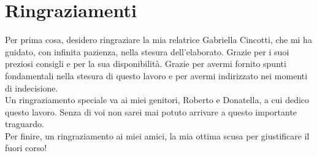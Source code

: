 \documentclass[../main.tex]{subfiles}
\begin{document}
\chapter*{Ringraziamenti}

Per prima cosa, desidero ringraziare la mia relatrice Gabriella Cincotti, che mi ha guidato, con infinita pazienza, nella stesura dell’elaborato. Grazie per i suoi preziosi consigli e per la sua disponibilità. Grazie per avermi fornito spunti fondamentali nella stesura di questo lavoro e per avermi indirizzato nei momenti di indecisione.\\

\noindent Un ringraziamento speciale va ai miei genitori, Roberto e Donatella, a cui dedico questo lavoro. Senza di voi non sarei mai potuto arrivare a questo importante traguardo.\\

\noindent Per finire, un ringraziamento ai miei amici, la mia ottima scusa per giustificare il fuori corso!
\end{document}
